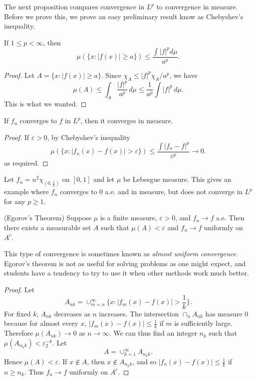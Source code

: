 \begin{sloppypar}
The next proposition compares convergence in $L^p$ to convergence in measure. Before we prove this, we prove an easy preliminary result know as Chebyshev's inequality.

\begin{lemma}
  If $1 \le p < \infty$, then
  \[
    \mu( \{x : |f(x)| \ge a\}) \le \frac{\int|f|^p d\mu}{a^p}
  .\] 
\end{lemma}
\begin{proof}
  Let $A = \{x : |f(x)| \ge a\} .$ Since $\chi_A \le |f|^p \chi_A / a^p$, we have
  \[
    \mu(A) \le \int_A \frac{|f|^p}{a^p} \,d\mu \le \frac{1}{a^p}\int|f|^p \,d\mu
  .\] This is what we wanted.
\end{proof}

\begin{prop}
  If $f_n$ converges to $f$ in $L^p$, then it converges in measure.
\end{prop}
\begin{proof}
  If $ \varepsilon > 0$, by Chebyshev's inequality
  \[
    \mu( \{x : |f_n(x) - f(x)| > \varepsilon\} ) \le \frac{\int|f_n - f|^p}{ \varepsilon^p} \to 0
  .\] as required.
\end{proof}

\begin{eg}
  Let $f_n = n^2 \chi_{(0,\frac{1}{n})}$ on $[0,1]$ and let $\mu$ be Lebesgue measure. This gives an example where $f_n$ converges to $0$ a.e. and in measure, but does not converge in $L^p$ for any $p \ge 1$.
\end{eg}

\begin{theorem}
  (Egorov's Theorem) Suppose $\mu$ is a finite measure, $ \varepsilon > 0$, and $f_n \to f$ a.e. Then there exists a measurable set $A$ such that $\mu(A) < \varepsilon$ and $f_n \to f$ uniformly on $A^c$.
\end{theorem}
This type of convergence is sometimes known as \textit{almost uniform convergence}. Egorov's theorem is not as useful for solving problems as one might expect, and students have a tendency to try to use it when other methods work much better.
\begin{proof}
  Let
\[
  A_{nk} = \cup_{m=n}^{\infty} \{x : |f_m(x) - f(x)| > \frac{1}{k}\}
.\] 
For fixed $k$, $A_{nk}$ decreases as $n$ increases. The intersection $\cap_n A_{nk}$ has measure $0$ because for almost every $x$, $|f_m(x) - f(x) | \le  \frac{1}{k}$ if $m$ is sufficiently large. Therefore $\mu(A_{nk}) \to 0$ as $n \to \infty$. We can thus find an integer $n_k$ such that $\mu(A_{n_k k}) < \varepsilon_2^{-k}$. Let
\[
  A = \cup_{k=1}^{\infty}A_{n_k k}
.\] Hence $\mu(A) < \varepsilon$. If $x \not\in A$, then $x \not\in  A_{n_k k}$, and so $|f_n(x) - f(x) | \le \frac{1}{k}$ if $n \ge n_k$. Thus $f_n \to f$ uniformly on $A^c$.
\end{proof}

\end{sloppypar}
